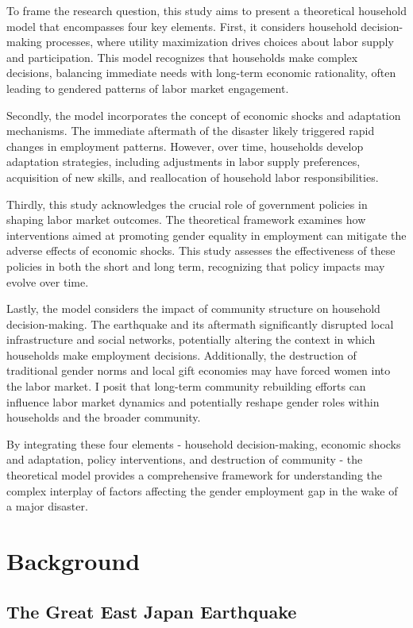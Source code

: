 \documentclass[12pt,halfline,a4paper]{ouparticle}
\begin{document}
To frame the research question, this study aims to present a theoretical household model that encompasses four key elements. First, it considers household decision-making processes, where utility maximization drives choices about labor supply and participation. This model recognizes that households make complex decisions, balancing immediate needs with long-term economic rationality, often leading to gendered patterns of labor market engagement.

Secondly, the model incorporates the concept of economic shocks and adaptation mechanisms. The immediate aftermath of the disaster likely triggered rapid changes in employment patterns. However, over time, households develop adaptation strategies, including adjustments in labor supply preferences, acquisition of new skills, and reallocation of household labor responsibilities.

Thirdly, this study acknowledges the crucial role of government policies in shaping labor market outcomes. The theoretical framework examines how interventions aimed at promoting gender equality in employment can mitigate the adverse effects of economic shocks. This study assesses the effectiveness of these policies in both the short and long term, recognizing that policy impacts may evolve over time.

Lastly, the model considers the impact of community structure on household decision-making. The earthquake and its aftermath significantly disrupted local infrastructure and social networks, potentially altering the context in which households make employment decisions. Additionally, the destruction of traditional gender norms and local gift economies may have forced women into the labor market. I posit that long-term community rebuilding efforts can influence labor market dynamics and potentially reshape gender roles within households and the broader community.

By integrating these four elements - household decision-making, economic shocks and adaptation, policy interventions, and destruction of community - the theoretical model provides a comprehensive framework for understanding the complex interplay of factors affecting the gender employment gap in the wake of a major disaster.

\section{Background}
\label{sec2}

\subsection{The Great East Japan Earthquake }
\label{sec5.1}
\end{document}
